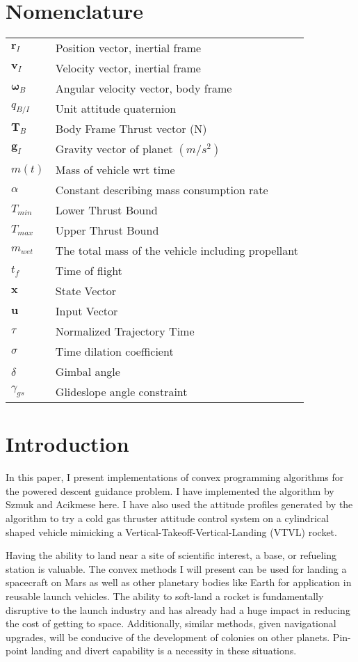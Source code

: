 \documentclass[conf]{new-aiaa}
\begin{document}
\begin{singlespace}
\section*{Nomenclature}
{\renewcommand\arraystretch{1.0}
\noindent\begin{longtable*}{@{}l @{\quad=\quad} l@{}}
$\mathbf{r}_I$  	& Position vector, inertial frame\\
$\mathbf{v}_I$  	& Velocity vector, inertial frame\\
$\mathbf{\omega}_B$  	& Angular velocity vector, body frame\\
$q_{B/I}$  	& Unit attitude quaternion\\
$\textbf{T}_B$  & Body Frame Thrust vector (N)\\
$\mathbf{g}_I$   		&Gravity vector of planet $(m/s^2)$ \\
$m(t)$  			&Mass of vehicle wrt time\\
$\alpha$ 	& Constant describing mass consumption rate \\
$T_{min}$   & Lower Thrust Bound\\
$T_{max}$   & Upper Thrust Bound\\
$m_{wet}$		& The total mass of the vehicle including propellant\\
$t_f$			& Time of flight\\
$\mathbf{x}$		& State Vector\\
$\mathbf{u}$		& Input Vector\\
$\tau$	& Normalized Trajectory Time \\
$\sigma$	& Time dilation coefficient \\
$\delta$		& Gimbal angle \\
$\gamma_{gs}$		& Glideslope angle constraint\\
\end{longtable*}}

\clearpage
\section{Introduction}
In this paper, I present implementations of convex programming algorithms for the powered descent guidance problem. I have implemented the algorithm by Szmuk and Acikmese here\cite{6dofsucc}. I have also used the attitude profiles generated by the algorithm to try a cold gas thruster attitude control system on a cylindrical shaped vehicle mimicking a Vertical-Takeoff-Vertical-Landing (VTVL) rocket.

Having the ability to land near a site of scientific interest, a base, or refueling station is valuable. The convex methods I will present can be used for landing a spacecraft on Mars as well as other planetary bodies like Earth for application in reusable launch vehicles. The ability to soft-land a rocket is fundamentally disruptive to the launch industry and has already had a huge impact in reducing the cost of getting to space. Additionally, similar methods, given navigational upgrades, will be conducive of the development of colonies on other planets. Pin-point landing and divert capability is a necessity in these situations.


\end{singlespace}
\end{document}
